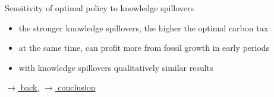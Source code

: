 \documentclass[11pt,aspectratio=169]{beamer}
\begin{document}
\begin{frame}{Sensitivity of optimal policy to knowledge spillovers}
\begin{figure}[h!!]
\begin{subfigure}{0.4\textwidth}
	\end{subfigure}
\end{figure}
\vspace{2mm}
\begin{block}{}
	\begin{itemize}
		\item the stronger knowledge spillovers, the higher the optimal carbon tax
		\item at the same time, can profit more from fossil growth in early periods
		\item with knowledge spillovers qualitatively similar results
	\end{itemize}
\end{block}	

\vspace{-5mm}
\hfill
\hyperlink{backOPT}{\tiny{$\rightarrow$ back,}}	\hyperlink{conc}{\tiny{$\rightarrow$ conclusion}}
\end{frame}
\end{document}
